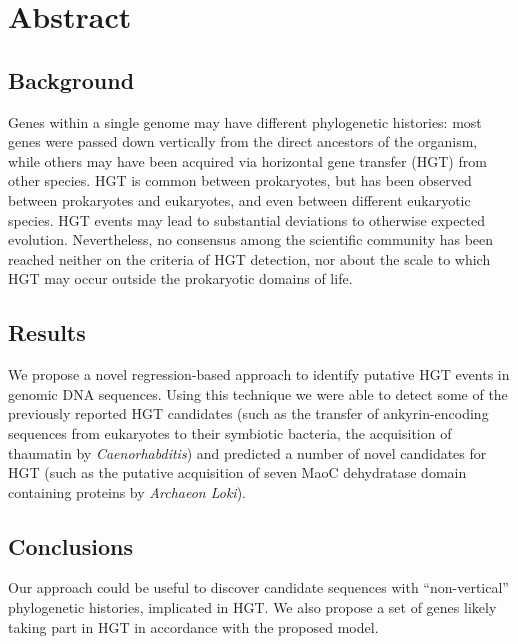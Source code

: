 \section{Abstract}
\label{abstract}

\subsection{Background}
\label{bg}
Genes within a single genome may have different phylogenetic histories: most
genes were passed down vertically from the direct ancestors of the organism,
while others may have been acquired via horizontal gene transfer (HGT) from
other species. HGT is common between prokaryotes, but has been observed between
prokaryotes and eukaryotes, and even between different eukaryotic species. HGT
events may lead to substantial deviations to otherwise expected evolution.
Nevertheless, no consensus among the scientific community has been reached
neither on the criteria of HGT detection, nor about the scale to which HGT may
occur outside the prokaryotic domains of life.

\subsection{Results}
\label{res}
We propose a novel regression-based approach to identify putative HGT events in
genomic DNA sequences. Using this technique we were able to detect some of the
previously reported HGT candidates (such as the transfer of ankyrin-encoding
sequences from eukaryotes to their symbiotic bacteria, the acquisition of
thaumatin by \textit{Caenorhabditis}) and predicted a number of novel
candidates for HGT (such as the putative acquisition of seven MaoC dehydratase
domain containing proteins by \textit{Archaeon Loki}).

\subsection{Conclusions}
\label{concl}
Our approach could be useful to discover candidate sequences with
``non-vertical'' phylogenetic histories, implicated in HGT. We also propose a
set of genes likely taking part in HGT in accordance with the proposed model.
